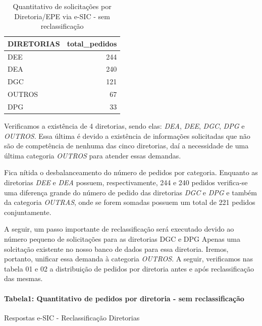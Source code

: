 \documentclass[]{article}
\newenvironment{Shaded}{\begin{snugshade}}{\end{snugshade}}
\newcommand{\KeywordTok}[1]{\textcolor[rgb]{0.13,0.29,0.53}{\textbf{#1}}}
\newcommand{\DataTypeTok}[1]{\textcolor[rgb]{0.13,0.29,0.53}{#1}}
\newcommand{\StringTok}[1]{\textcolor[rgb]{0.31,0.60,0.02}{#1}}
\newcommand{\OperatorTok}[1]{\textcolor[rgb]{0.81,0.36,0.00}{\textbf{#1}}}
\newcommand{\NormalTok}[1]{#1}
\let\oldparagraph\paragraph
\renewcommand{\paragraph}[1]{\oldparagraph{#1}\mbox{}}
\begin{document}
\begin{table}[!h]

\caption{\label{tab:unnamed-chunk-17}Quantitativo de solicitações por Diretoria/EPE via e-SIC - sem reclassificação}
\centering
\begin{tabular}{lr}
\toprule
DIRETORIAS & total\_pedidos\\
\midrule
\rowcolor{gray!6}  DEE & 244\\
DEA & 240\\
\rowcolor{gray!6}  DGC & 121\\
OUTROS & 67\\
\rowcolor{gray!6}  DPG & 33\\
\bottomrule
\end{tabular}
\end{table}

Verificamos a existência de 4 diretorias, sendo elas: \emph{DEA},
\emph{DEE}, \emph{DGC}, \emph{DPG} e \emph{OUTROS}. Essa última é devido
a existência de informações solicitadas que não são de competência de
nenhuma das cinco diretorias, daí a necessidade de uma última categoria
\emph{OUTROS} para atender essas demandas.

Fica nítida o desbalanceamento do número de pedidos por categoria.
Enquanto as diretorias \emph{DEE} e \emph{DEA} possuem, respectivamente,
244 e 240 pedidos verifica-se uma diferença grande do número de pedido
das diretorias \emph{DGC} e \emph{DPG} e também da categoria
\emph{OUTRAS}, onde se forem somadas possuem um total de 221 pedidos
conjuntamente.

A seguir, um passo importante de reclassificação será executado devido
ao número pequeno de solicitações para as diretorias DGC e DPG Apenas
uma solcitação existente no nosso banco de dados para essa diretoria.
Iremos, portanto, unificar essa demanda à categoria \emph{OUTROS}. A
seguir, verificamos nas tabela 01 e 02 a distribuição de pedidos por
diretoria antes e após reclassificação das mesmas.

\paragraph{Tabela1: Quantitativo de pedidos por diretoria - sem
reclassificação}\label{tabela1-quantitativo-de-pedidos-por-diretoria---sem-reclassificacao-1}

Respostas e-SIC - Reclassificação Diretorias

\begin{Shaded}
\end{Shaded}
\end{document}
